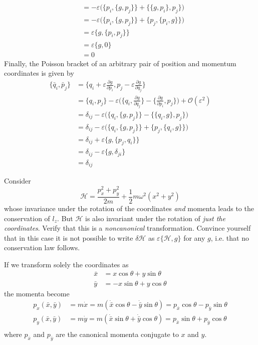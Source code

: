 \documentclass[../principles-of-quantum-mechanics.tex]{subfiles}
\begin{document}
\begin{questions}
\begin{solution}
\begin{align*}
				&= -\varepsilon\Big(\{p_i, \{g, p_j\}\} + \{\{g, p_i\}, p_j\}\Big) \\
				&= -\varepsilon\Big(\{p_i, \{g, p_j\}\} + \{p_j, \{p_i, g\}\}\Big) \\
				&= \varepsilon\{g, \{p_i, p_j\}\} \\
				&= \varepsilon\{g, 0\} \\
				&= 0
			\end{align*}
			Finally, the Poisson bracket of an arbitrary pair of position and momentum coordinates is given by
			\begin{align*}
				\{\bar{q}_i, \bar{p}_j\} &= \{q_i + \varepsilon\frac{\partial g}{\partial p_i}, p_j - \varepsilon\frac{\partial g}{\partial q_j}\} \\
				&= \{q_i, p_j\} -\varepsilon\Big(\{q_i, \frac{\partial g}{\partial q_j}\} - \{\frac{\partial g}{\partial p_i}, p_j\}\Big) + \mathcal{O}(\varepsilon^2) \\
				&= \delta_{ij} - \varepsilon\Big(\{q_i, \{g, p_j\}\} - \{\{q_i, g\}, p_j\}\Big) \\
				&= \delta_{ij} - \varepsilon\Big(\{q_i, \{g, p_j\}\} + \{p_j, \{q_i, g\}\}\Big) \\
				&= \delta_{ij} + \varepsilon\{g, \{p_j, q_i\}\} \\
				&= \delta_{ij} - \varepsilon\{g, \delta_{ji}\} \\
				&= \delta_{ij}
			\end{align*}
		\end{solution}
		
		\question Consider
		\[
			\mathcal{H} = \frac{p_x^2 + p_y^2}{2m} + \frac{1}{2}m\omega^2(x^2+y^2)
		\]
		whose invariance under the rotation of the coordinates \textit{and} momenta leads to the conservation of $l_z$. But $\mathcal{H}$ is also invariant under the rotation of \textit{just the coordinates}. Verify that this is a \textit{noncanonical} transformation. Convince yourself that in this case it is not possible to write $\delta\mathcal{H}$ as $\varepsilon\{\mathcal{H}, g\}$ for any $g$, i.e. that no conservation law follows.
		
		\begin{solution}
			If we transform solely the coordinates as
			\begin{align*}
				\bar{x} &= x\cos\theta + y\sin\theta \\
				\bar{y} &= -x\sin\theta + y\cos\theta
			\end{align*}
			the momenta become
			\begin{align*}
				p_x(\bar{x}, \bar{y}) &= m\dot{x} = m(\dot{\bar{x}}\cos\theta - \dot{\bar{y}}\sin\theta) = p_{\bar{x}}\cos\theta - p_{\bar{y}}\sin\theta\\
				p_y(\bar{x}, \bar{y}) &= m\dot{y} = m(\dot{\bar{x}}\sin\theta + \dot{\bar{y}}\cos\theta) = p_{\bar{x}}\sin\theta + p_{\bar{y}}\cos\theta \\
			\end{align*}
			where $p_{\bar{x}}$ and $p_{\bar{y}}$ are the canonical momenta conjugate to $x$ and $y$.
			

\end{solution}
\end{questions}
\end{document}
